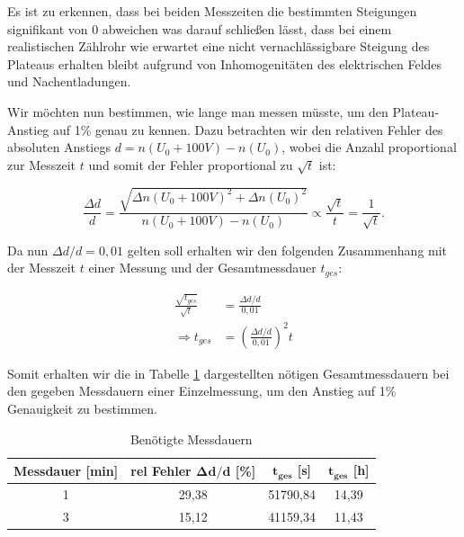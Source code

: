 \documentclass{article}
\begin{document}
\phantom{.}

Es ist zu erkennen, dass bei beiden Messzeiten die bestimmten Steigungen signifikant von 0 abweichen was darauf schließen lässt, dass bei einem realistischen Zählrohr wie erwartet eine nicht vernachlässigbare Steigung des Plateaus erhalten bleibt aufgrund von Inhomogenitäten des elektrischen Feldes und Nachentladungen. 

Wir möchten nun bestimmen, wie lange man messen müsste, um den Plateau-Anstieg auf 1\% genau zu kennen. Dazu betrachten wir den relativen Fehler des absoluten Anstiegs $d = n(U_0 + 100V) - n(U_0)$, wobei die Anzahl proportional zur Messzeit $t$ und somit der Fehler proportional zu $\sqrt{t}$ ist:

\begin{equation}
    \frac{\Delta d}{d} = \frac{\sqrt{\Delta n(U_0 + 100V)^2 + \Delta n(U_0)^2}}{n(U_0 + 100V) - n(U_0)} \propto \frac{\sqrt{t}}{t} = \frac{1}{\sqrt{t}}.
\end{equation}

Da nun $\Delta d / d = 0,01$ gelten soll erhalten wir den folgenden Zusammenhang mit der Messzeit $t$ einer Messung und der Gesamtmessdauer $t_{ges}$:

\begin{equation}
    \begin{split}
        \frac{\sqrt{t_{ges}}}{\sqrt{t}} &= \frac{\Delta d / d}{0,01} \\ 
        \Rightarrow t_{ges} &= \left( \frac{\Delta d / d}{0,01} \right)^2 t
    \end{split}
\end{equation}

Somit erhalten wir die in Tabelle \ref{tab:A1-Messdauern} dargestellten nötigen Gesamtmessdauern bei den gegeben Messdauern einer Einzelmessung, um den Anstieg auf 1\% Genauigkeit zu bestimmen.

\phantom{.}

\begin{table}[!h]
    \centering
    \begin{tabular}{cccc}
        \hline
        \textbf{Messdauer} [min] & \textbf{rel Fehler} $\bm{\Delta d / d}$ [\%] & $\bm{t_{ges}}$ [s] & $\bm{t_{ges}}$ [h]  \\ \hline
         1 & 29,38 & 51790,84 & 14,39 \\
         3 & 15,12 & 41159,34 & 11,43 \\\hline
    \end{tabular}%
    \caption{Benötigte Messdauern}
    \label{tab:A1-Messdauern}
\end{table}
\end{document}

